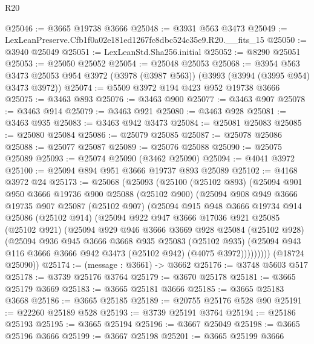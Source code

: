 \begin{lexlean}{R20}
\begin{coremodule}
@25046 := @3665 @19738 @3666
@25048 := @3931 @563 @3473
@25049 := LexLeanPreserve.Cfb1f0a02e181ed1267fc8dbc524c35e9.R20.__fits_15
@25050 := @3940 @25049
@25051 := LexLeanStd.Sha256.initial
@25052 := @8290 @25051
@25053 := @25050 @25052
@25054 := @25048 @25053
@25068 := @3954
    @563
    @3473
    @25053
    @954
    @3972
    (@3978 (@3987 @563))
    (@3993 (@3994 (@3995 @954) @3473 @3972))
@25074 := @5509 @3972 @194 @423 @952 @19738 @3666
@25075 := @3463 @893
@25076 := @3463 @900
@25077 := @3463 @907
@25078 := @3463 @914
@25079 := @3463 @921
@25080 := @3463 @928
@25081 := @3463 @935
@25083 := @3463 @942 @3473
@25084 := @25081 @25083
@25085 := @25080 @25084
@25086 := @25079 @25085
@25087 := @25078 @25086
@25088 := @25077 @25087
@25089 := @25076 @25088
@25090 := @25075 @25089
@25093 := @25074 @25090 (@3462 @25090)
@25094 := @4041 @3972
@25100 := @25094 @894 @951 @3666 @19737 @893 @25089
@25102 := @4168 @3972 @24
@25173 := @25068
    (@25093
      (@25100
        (@25102 @893)
        (@25094
          @901
          @950
          @3666
          @19736
          @900
          @25088
          (@25102 @900)
          (@25094
            @908
            @949
            @3666
            @19735
            @907
            @25087
            (@25102 @907)
            (@25094
              @915
              @948
              @3666
              @19734
              @914
              @25086
              (@25102 @914)
              (@25094
                @922
                @947
                @3666
                @17036
                @921
                @25085
                (@25102 @921)
                (@25094
                  @929
                  @946
                  @3666
                  @3669
                  @928
                  @25084
                  (@25102 @928)
                  (@25094
                    @936
                    @945
                    @3666
                    @3668
                    @935
                    @25083
                    (@25102 @935)
                    (@25094 @943 @116 @3666 @3666 @942 @3473 (@25102 @942) (@4075 @3972)))))))))
      (@18724 @25090))
@25174 := (message : @3661) -> @3662
@25176 := @3748 @5603 @517
@25178 := @3739 @25176 @3764
@25179 := @3670 @25178
@25181 := @3665 @25179 @3669
@25183 := @3665 @25181 @3666
@25185 := @3665 @25183 @3668
@25186 := @3665 @25185
@25189 := @20755 @25176 @528 @90
@25191 := @22260 @25189 @528
@25193 := @3739 @25191 @3764
@25194 := @25186 @25193
@25195 := @3665 @25194
@25196 := @3667 @25049
@25198 := @3665 @25196 @3666
@25199 := @3667 @25198
@25201 := @3665 @25199 @3666

\end{coremodule}
\end{lexlean}
